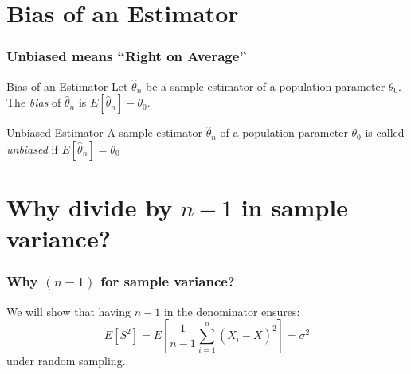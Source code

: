 \section{Bias of an Estimator}
\begin{frame}
\frametitle{Unbiased means ``Right on Average''}

\begin{block}{Bias of an Estimator}
Let $\widehat{\theta}_n$ be a sample estimator of a population parameter $\theta_0$. The \emph{bias} of $\widehat{\theta}_n$ is $E[\widehat{\theta}_n] - \theta_0$.
\end{block}

\begin{block}{Unbiased Estimator}
A sample estimator $\widehat{\theta}_n$ of a population parameter $\theta_0$ is called \emph{unbiased} if $E[\widehat{\theta}_n]= \theta_0$
\end{block}

\end{frame}


\section{Why divide by $n-1$ in sample variance?}

\begin{frame}
\frametitle{Why $(n-1)$ for sample variance?}
\alert{We will show that having $n-1$ in the denominator ensures:}
$$E[S^2] =E\left[ \frac{1}{n-1} \sum_{i=1}^n \left(X_i - \bar{X}\right)^2\right] = \sigma^2$$
\alert{under random sampling.}
\end{frame}



